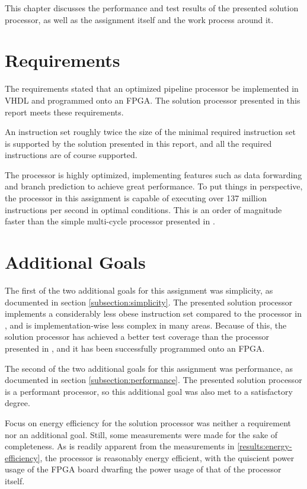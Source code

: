 This chapter discusses the performance and test results of the presented solution processor, as well as the assignment itself and the work process around it.

\section{Requirements}

The requirements stated that an optimized pipeline processor be implemented in VHDL and programmed onto an FPGA.
The solution processor presented in this report meets these requirements.

An instruction set roughly twice the size of the minimal required instruction set is supported by the solution presented in this report, and all the required instructions are of course supported.

The processor is highly optimized, implementing features such as data forwarding and branch prediction to achieve great performance.
To put things in perspective, the processor in this assignment is capable of executing over 137 million instructions per second in optimal conditions.
This is an order of magnitude faster than the simple multi-cycle processor presented in \cite{assignment-1}.

\section{Additional Goals}

The first of the two additional goals for this assignment was simplicity, as documented in section \vref{subsection:simplicity}.
The presented solution processor implements a considerably less obese instruction set compared to the processor in \cite{assignment-1}, and is implementation-wise less complex in many areas.
Because of this, the solution processor has achieved a better test coverage than the processor presented in \cite{assingment-1}, and it has been successfully programmed onto an FPGA.

The second of the two additional goals for this assignment was performance, as documented in section \vref{subsection:performance}.
The presented solution processor is a performant processor, so this additional goal was also met to a satisfactory degree.

Focus on energy efficiency for the solution processor was neither a requirement nor an additional goal.
Still, some measurements were made for the sake of completeness.
As is readily apparent from the measurements in \vref{results:energy-efficiency}, the processor is reasonably energy efficient, with the quiscient power usage of the FPGA board dwarfing the power usage of that of the processor itself.

